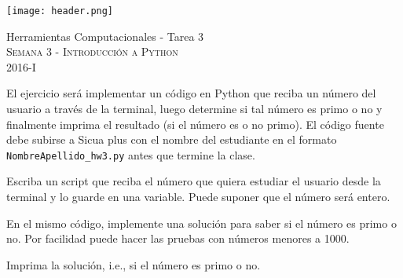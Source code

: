 \documentclass[11pt,letterpaper]{exam}
\begin{document}
\begin{center}

\texttt{[image: header.png]}

\vspace{1.0cm}
{\Large Herramientas Computacionales - Tarea 3} \\
\textsc{Semana 3 - Introducci\'on a Python}\\
2016-I\\
\end{center}



\vspace{0.5cm}

\noindent
El ejercicio ser\'a implementar un c\'odigo en Python que reciba un n\'umero del usuario a trav\'es de la terminal, luego determine si tal n\'umero es primo o no y finalmente imprima el resultado (si el n\'umero es o no primo). El c\'odigo fuente debe subirse a Sicua plus con el nombre del estudiante en el formato \verb"NombreApellido_hw3.py" antes que termine la clase. 

\vspace{0.5cm}

\begin{questions}
 

Escriba un script que reciba el n\'umero que quiera estudiar el usuario desde la terminal y lo guarde en una variable. Puede suponer que el n\'umero ser\'a entero.


En el mismo c\'odigo, implemente una soluci\'on para saber si el n\'umero es primo o no. Por facilidad puede hacer las pruebas con n\'umeros menores a 1000.


Imprima la soluci\'on, i.e., si el n\'umero es primo o no.

\end{questions}
\end{document}
